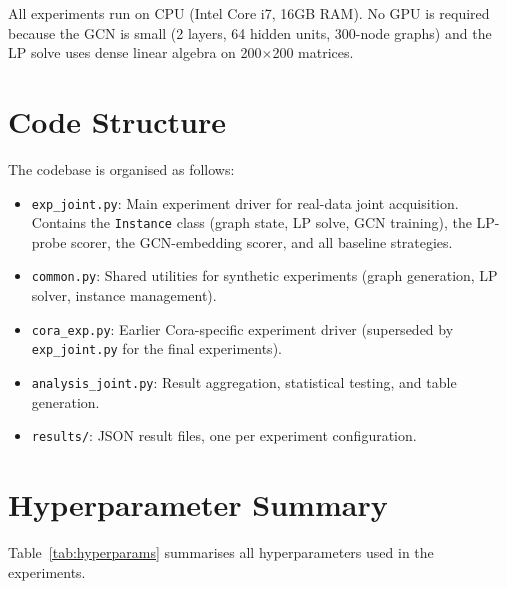 \documentclass[12pt,a4paper,oneside]{report}
\begin{document}
All experiments run on CPU (Intel Core i7, 16GB RAM). No GPU is required because the GCN is small (2 layers, 64 hidden units, 300-node graphs) and the LP solve uses dense linear algebra on 200$\times$200 matrices.

\section{Code Structure}

The codebase is organised as follows:
\begin{itemize}[leftmargin=2em]
    \item \texttt{exp\_joint.py}: Main experiment driver for real-data joint acquisition. Contains the \texttt{Instance} class (graph state, LP solve, GCN training), the LP-probe scorer, the GCN-embedding scorer, and all baseline strategies.
    \item \texttt{common.py}: Shared utilities for synthetic experiments (graph generation, LP solver, instance management).
    \item \texttt{cora\_exp.py}: Earlier Cora-specific experiment driver (superseded by \texttt{exp\_joint.py} for the final experiments).
    \item \texttt{analysis\_joint.py}: Result aggregation, statistical testing, and table generation.
    \item \texttt{results/}: JSON result files, one per experiment configuration.
\end{itemize}

\section{Hyperparameter Summary}

Table~\ref{tab:hyperparams} summarises all hyperparameters used in the experiments.
\end{document}
